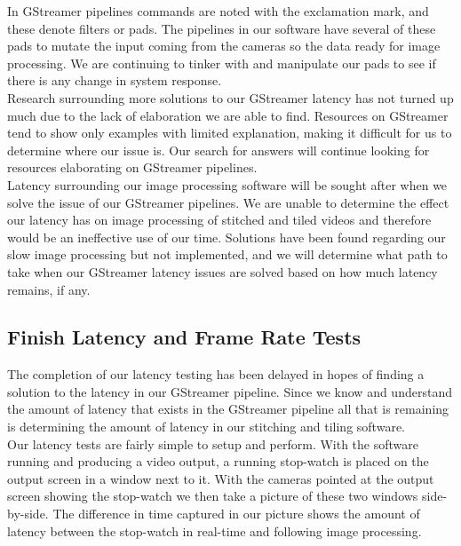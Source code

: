 \documentclass[letterpaper,10pt,serif,draftclsnofoot,onecolumn,compsoc,titlepage]{IEEEtran}
\begin{document}
In GStreamer pipelines commands are noted with the exclamation mark, and these denote 
filters or pads. The pipelines in our software have several of these pads to mutate 
the input coming from the cameras so the data ready for image processing. We are continuing 
to tinker with and manipulate our pads to see if there is any change in system response. \\

Research surrounding more solutions to our GStreamer latency has not turned up much 
due to the lack of elaboration we are able to find. Resources on GStreamer tend to show 
only examples with limited explanation, making it difficult for us to determine where 
our issue is. Our search for answers will continue looking for resources elaborating on 
GStreamer pipelines. \\

Latency surrounding our image processing software will be sought after when we solve the 
issue of our GStreamer pipelines. We are unable to determine the effect our latency has 
on image processing of stitched and tiled videos and therefore would be an ineffective 
use of our time. Solutions have been found regarding our slow image processing but not 
implemented, and we will determine what path to take when our GStreamer latency issues 
are solved based on how much latency remains, if any. \\

\subsection{Finish Latency and Frame Rate Tests}

The completion of our latency testing has been delayed in hopes of finding a solution to 
the latency in our GStreamer pipeline. Since we know and understand the amount of latency 
that exists in the GStreamer pipeline all that is remaining is determining the amount of 
latency in our stitching and tiling software. \\

Our latency tests are fairly simple to setup and perform. With the software running and 
producing a video output, a running stop-watch is placed on the output screen in a window 
next to it. With the cameras pointed at the output screen showing the stop-watch we then 
take a picture of these two windows side-by-side. The difference in time captured in our 
picture shows the amount of latency between the stop-watch in real-time and following 
image processing. \\
\end{document}
